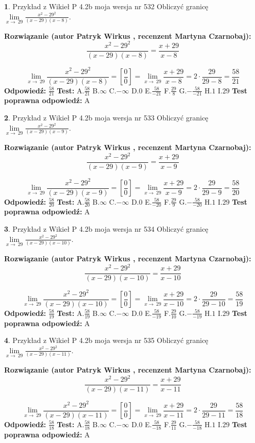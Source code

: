 \documentclass[12pt, a4paper]{article}
\theoremstyle{definition} %
\newtheorem{zad}{}
\newcommand{\zadStart}[1]{\begin{zad}#1\newline}
\newcommand{\zadStop}{\end{zad}}
\newcommand{\rozwStart}[2]{\noindent \textbf{Rozwiązanie (autor #1 , recenzent #2): }\newline}
\newcommand{\rozwStop}{\newline}
\newcommand{\odpStart}{\noindent \textbf{Odpowiedź:}\newline}
\newcommand{\odpStop}{\newline}
\newcommand{\testStart}{\noindent \textbf{Test:}\newline}
\newcommand{\testStop}{\newline}
\newcommand{\kluczStart}{\noindent \textbf{Test poprawna odpowiedź:}\newline}
\newcommand{\kluczStop}{\newline}
\begin{document}
\zadStart{Przykład z Wikieł P 4.2b moja wersja nr 532}
Obliczyć granicę $\lim\limits_{x\to\ 29}\frac{x^{2}-29^{2}}{(x-29)(x-8)}$.
\zadStop
\rozwStart{Patryk Wirkus}{Martyna Czarnobaj}
$$\frac{x^{2}-29^{2}}{(x-29)(x-8)}=\frac{x+29}{x-8}$$

$$\lim\limits_{x\to\ 29}\frac{x^{2}-29^{2}}{(x-29)(x-8)}=[\frac{0}{0}]=\lim\limits_{x\to\ 29}\frac{x+29}{x-8}=2 \cdot \frac{29}{29-8} = \frac{58}{21}$$
\rozwStop
\odpStart
$\frac{58}{21}$
\odpStop
\testStart
A.$\frac{58}{21}$
B.$\infty$
C.$-\infty$
D.$0$
E.$\frac{58}{-21}$
F.$\frac{29}{8}$
G.$-\frac{58}{-21}$
H.$1$
I.$29$
\testStop
\kluczStart
A
\kluczStop



\zadStart{Przykład z Wikieł P 4.2b moja wersja nr 533}
Obliczyć granicę $\lim\limits_{x\to\ 29}\frac{x^{2}-29^{2}}{(x-29)(x-9)}$.
\zadStop
\rozwStart{Patryk Wirkus}{Martyna Czarnobaj}
$$\frac{x^{2}-29^{2}}{(x-29)(x-9)}=\frac{x+29}{x-9}$$

$$\lim\limits_{x\to\ 29}\frac{x^{2}-29^{2}}{(x-29)(x-9)}=[\frac{0}{0}]=\lim\limits_{x\to\ 29}\frac{x+29}{x-9}=2 \cdot \frac{29}{29-9} = \frac{58}{20}$$
\rozwStop
\odpStart
$\frac{58}{20}$
\odpStop
\testStart
A.$\frac{58}{20}$
B.$\infty$
C.$-\infty$
D.$0$
E.$\frac{58}{-20}$
F.$\frac{29}{9}$
G.$-\frac{58}{-20}$
H.$1$
I.$29$
\testStop
\kluczStart
A
\kluczStop



\zadStart{Przykład z Wikieł P 4.2b moja wersja nr 534}
Obliczyć granicę $\lim\limits_{x\to\ 29}\frac{x^{2}-29^{2}}{(x-29)(x-10)}$.
\zadStop
\rozwStart{Patryk Wirkus}{Martyna Czarnobaj}
$$\frac{x^{2}-29^{2}}{(x-29)(x-10)}=\frac{x+29}{x-10}$$

$$\lim\limits_{x\to\ 29}\frac{x^{2}-29^{2}}{(x-29)(x-10)}=[\frac{0}{0}]=\lim\limits_{x\to\ 29}\frac{x+29}{x-10}=2 \cdot \frac{29}{29-10} = \frac{58}{19}$$
\rozwStop
\odpStart
$\frac{58}{19}$
\odpStop
\testStart
A.$\frac{58}{19}$
B.$\infty$
C.$-\infty$
D.$0$
E.$\frac{58}{-19}$
F.$\frac{29}{10}$
G.$-\frac{58}{-19}$
H.$1$
I.$29$
\testStop
\kluczStart
A
\kluczStop



\zadStart{Przykład z Wikieł P 4.2b moja wersja nr 535}
Obliczyć granicę $\lim\limits_{x\to\ 29}\frac{x^{2}-29^{2}}{(x-29)(x-11)}$.
\zadStop
\rozwStart{Patryk Wirkus}{Martyna Czarnobaj}
$$\frac{x^{2}-29^{2}}{(x-29)(x-11)}=\frac{x+29}{x-11}$$

$$\lim\limits_{x\to\ 29}\frac{x^{2}-29^{2}}{(x-29)(x-11)}=[\frac{0}{0}]=\lim\limits_{x\to\ 29}\frac{x+29}{x-11}=2 \cdot \frac{29}{29-11} = \frac{58}{18}$$
\rozwStop
\odpStart
$\frac{58}{18}$
\odpStop
\testStart
A.$\frac{58}{18}$
B.$\infty$
C.$-\infty$
D.$0$
E.$\frac{58}{-18}$
F.$\frac{29}{11}$
G.$-\frac{58}{-18}$
H.$1$
I.$29$
\testStop
\kluczStart
A
\kluczStop
\end{document}
